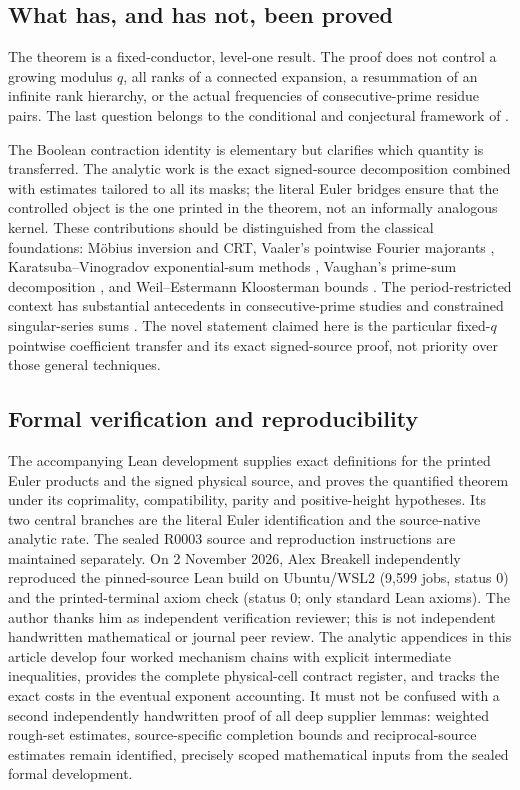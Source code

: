 \documentclass[11pt]{article}
\theoremstyle{definition}
\theoremstyle{remark}
\newcommand{\1}{\mathbf 1}
\begin{document}
\subsection{What has, and has not, been proved}

The theorem is a fixed-conductor, level-one result. The proof
does not control a growing modulus $q$, all ranks of a connected
expansion, a resummation of an infinite rank hierarchy, or the
actual frequencies of consecutive-prime residue pairs. The
last question belongs to the conditional and conjectural
framework of \cite{LemkeOliverSound2016}.

The Boolean contraction identity is elementary but clarifies
which quantity is transferred. The analytic work is the exact
signed-source decomposition combined with estimates tailored
to all its masks; the literal Euler bridges ensure that the
controlled object is the one printed in the theorem, not an
informally analogous kernel. These contributions should be distinguished from the classical
foundations: M\"obius inversion and CRT, Vaaler's pointwise
Fourier majorants \cite{Vaaler1985}, Karatsuba--Vinogradov
exponential-sum methods \cite{Karatsuba1971}, Vaughan's prime-sum
decomposition \cite{Vaughan1980}, and Weil--Estermann
Kloosterman bounds \cite{Weil1948,Estermann1961}.
The period-restricted context has substantial antecedents in
consecutive-prime studies \cite{GoldstonLedoan2011,LemkeOliverSound2016}
and constrained singular-series sums \cite{Kuperberg2025}.
The novel statement claimed here is the particular fixed-$q$
pointwise coefficient transfer and its exact signed-source proof,
not priority over those general techniques.

\subsection{Formal verification and reproducibility}

The accompanying Lean development supplies exact definitions for the
printed Euler products and the signed physical source, and proves the
quantified theorem under its coprimality, compatibility, parity and
positive-height hypotheses. Its two central branches are the literal
Euler identification and the source-native analytic rate. The sealed R0003 source and reproduction instructions are maintained
separately. On 2 November 2026, Alex Breakell independently reproduced
the pinned-source Lean build on Ubuntu/WSL2 (9,599 jobs, status 0) and
the printed-terminal axiom check (status 0; only standard Lean axioms).
The author thanks him as independent verification reviewer; this is
not independent handwritten mathematical or journal peer review. The analytic appendices in this article develop four
worked mechanism chains with explicit intermediate inequalities,
provides the complete physical-cell contract register, and
tracks the exact costs in the eventual exponent accounting.
It must not be confused with a second independently handwritten
proof of all deep supplier lemmas: weighted rough-set estimates,
source-specific completion bounds and reciprocal-source
estimates remain identified, precisely scoped mathematical inputs
from the sealed formal development.
\end{document}

